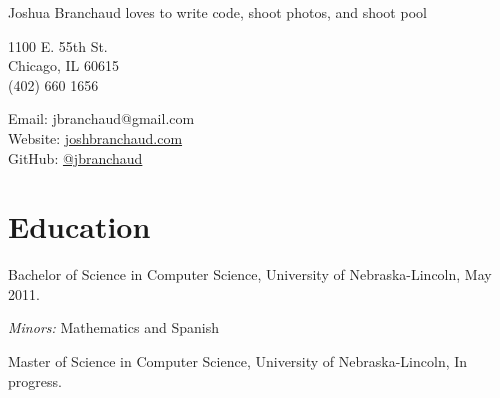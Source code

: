 \documentclass[10pt,letterpaper]{article}
\def\name{Joshua Branchaud}
\renewenvironment{itemize}{
  \begin{list}{}{
    \setlength{\leftmargin}{1.5em}
    \setlength{\itemsep}{0.25em}
    \setlength{\parskip}{0pt}
    \setlength{\parsep}{0.25em}
  }
}{
  \end{list}
}
\begin{document}
{\huge \name} \hfill {\color{Gray} {\large loves to write code, shoot photos, and shoot pool}}


\vspace{0.25in}

\begin{minipage}[t]{0.5\textwidth}
  1100 E. 55th St. \\
  Chicago, IL 60615 \\
  (402) 660 1656
\end{minipage}
\begin{minipage}[t]{0.5\textwidth}
  Email: jbranchaud@gmail.com \\
  Website: \href{http://joshbranchaud.com}{joshbranchaud.com} \\
  GitHub: \href{https://github.com/jbranchaud}{@jbranchaud}
\end{minipage}


%

\section*{Education}

\begin{itemize}


  \item Bachelor of Science in Computer Science, University of Nebraska-Lincoln, May 2011.

    \begin{itemize}
        \item \textit{Minors:} Mathematics and Spanish
    \end{itemize}
    
    \item Master of Science in Computer Science, University of Nebraska-Lincoln, In
    progress.

\end{itemize}
\end{document}
